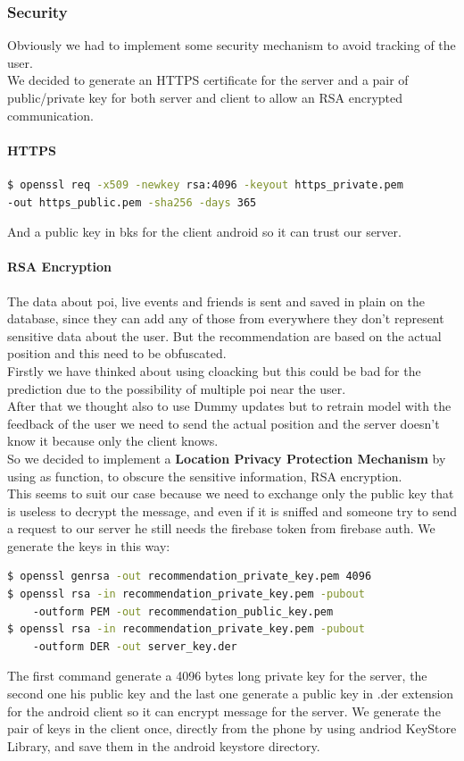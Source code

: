 \documentclass[../../main]{subfiles}
\begin{document}
\subsubsection{Security}
Obviously we had to implement some security mechanism to avoid tracking of the user.\\ We decided to generate an HTTPS certificate for the server and 
a pair of public/private key for both server and client to allow an RSA encrypted communication.
\paragraph{HTTPS}
\begin{lstlisting}[language=bash]
$ openssl req -x509 -newkey rsa:4096 -keyout https_private.pem 
-out https_public.pem -sha256 -days 365
\end{lstlisting}
And a public key in bks for the client android so it can trust our server.
\paragraph*{RSA Encryption}
The data about poi, live events and friends is sent and saved in plain on the database, since they can add any of those from everywhere they don't represent sensitive data about the user.
But the recommendation are based on the actual position and this need to be obfuscated.
\\Firstly we have thinked about using cloacking but this could be bad for the prediction due to the possibility of multiple poi near the user.
\\After that we thought also to use Dummy updates but to retrain model with the feedback of the user we need to send the actual position and the server doesn't know it because only the client knows.
\\So we decided to implement a \textbf{Location Privacy Protection Mechanism} by using as function, to obscure the sensitive information, RSA encryption.
\\This seems to suit our case because we need to exchange only the public key that is useless to decrypt the message, and even if it is sniffed and someone try to send a request to our server he still needs the firebase token from firebase auth.
\noindent We generate the keys in this way:
\begin{lstlisting}[language=bash]
$ openssl genrsa -out recommendation_private_key.pem 4096
$ openssl rsa -in recommendation_private_key.pem -pubout 
    -outform PEM -out recommendation_public_key.pem 
$ openssl rsa -in recommendation_private_key.pem -pubout 
    -outform DER -out server_key.der
\end{lstlisting}
The first command generate a 4096 bytes long private key for the server, the second one his public key and the last one generate a public key in .der extension for the android client so it can encrypt message for the server.
We generate the pair of keys in the client once, directly from the phone by using andriod KeyStore Library, and save them in the android keystore directory.
\end{document}
